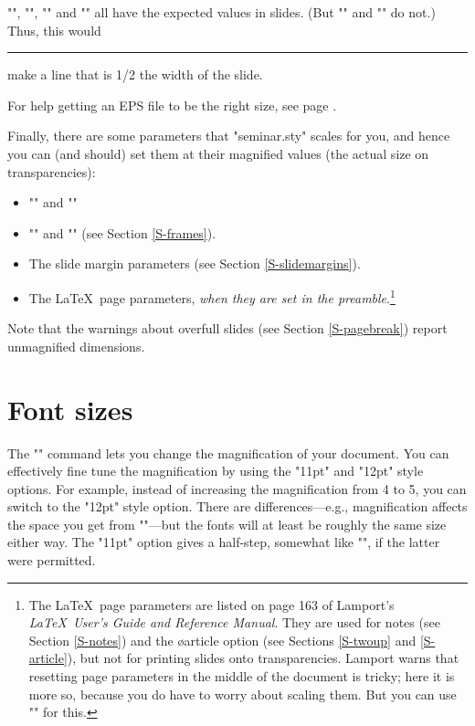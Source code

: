 "\textwidth", "\textheight", "\columnwidth" and "\linewidth" all have the
expected values in slides. (But "\slidewidth" and "\slideheight" do not.)
Thus, this would
\begin{LVerbatim}
  \rule{1pt}{.5\textwidth}
\end{LVerbatim}
make a line that is 1/2 the width of the slide.

For help getting an EPS file to be the right size, see page \pageref{EPS}.

Finally, there are some parameters that "seminar.sty" scales for you, and
hence you can (and should) set them at their magnified values (the actual size
on transparencies):
\begin{itemize}
  \item "\slidewidth" and "\slideheight"
  \item "\slideframewidth" and "\slideframesep" (see Section \ref{S-frames}).
  \item The slide margin parameters (see Section \ref{S-slidemargins}).
  \item The \LaTeX\ page parameters, {\em when they are set in the
preamble}.\footnote{The \LaTeX\ page parameters are listed on page 163 of
Lamport's {\em \LaTeX\ User's Guide and Reference Manual}. They are used for
notes (see Section \ref{S-notes}) and the \o{article} option (see Sections
\ref{S-twoup} and \ref{S-article}), but not for printing slides onto
transparencies. Lamport warns that resetting page parameters in the middle of
the document is tricky; here it is more so, because you do have to worry about
scaling them. But you can use "\setslidelength" for this.}
\end{itemize}

Note that the warnings about overfull slides (see Section \ref{S-pagebreak})
report unmagnified dimensions.


\section{Font sizes}

The "\slidesmag" command lets you change the magnification of your document.
You can effectively fine tune the magnification by using the "11pt" and "12pt"
style options. For example, instead of increasing the magnification from 4 to
5, you can switch to the "12pt" style option. There are differences---e.g.,
magnification affects the space you get from "\hspace{1in}"---but the fonts
will at least be roughly the same size either way. The "11pt" option gives a
half-step, somewhat like "", if the latter were permitted.

